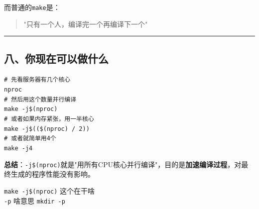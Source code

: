 \documentclass[11pt, a4paper]{article}
\begin{document}
\begin{aibox}
而普通的\texttt{make}是：

\begin{quote}
"只有一个人，编译完一个再编译下一个"
\end{quote}

\begin{center}\rule{\textwidth}{0.4pt}\end{center}

\subsection*{八、你现在可以做什么}

\begin{tcolorbox}[colback=white,colframe=gray!50!white,boxrule=0.5pt,arc=2pt,left=5pt,right=5pt,top=5pt,bottom=5pt]
\texttt{\# 先看服务器有几个核心}\\
\texttt{nproc}\\[0.5em]
\texttt{\# 然后用这个数量并行编译}\\
\texttt{make -j\$(nproc)}\\[0.5em]
\texttt{\# 或者如果内存紧张，用一半核心}\\
\texttt{make -j\$((\$(nproc) / 2))}\\[0.5em]
\texttt{\# 或者就简单用4个}\\
\texttt{make -j4}
\end{tcolorbox}

\textbf{总结}：\texttt{-j\$(nproc)}就是"用所有CPU核心并行编译"，目的是\textbf{加速编译过程}，对最终生成的程序性能没有影响。
\end{aibox}

\vspace{1.5em}

\begin{userbox}
\texttt{make -j\$(nproc)} 这个在干啥\\[0.5em]
\texttt{-p} 啥意思 \texttt{mkdir -p}
\end{userbox}
\end{document}
